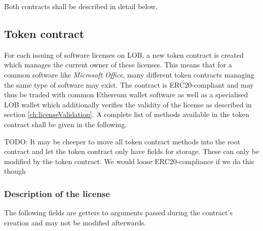 \documentclass[a4paper]{article}
\newcommand{\todo}[1]{\textsf{TODO: #1}}
\begin{document}
Both contracts shall be described in detail below.

\subsection{Token contract}
\label{ch:tokenContract}

For each issuing of software licenses on LOB, a new token contract is created which manages the current owner of these licenses. This means that for a common software like \emph{Microsoft Office}, many different token contracts managing the same type of software may exist. The contract is ERC20-compliant and may thus be traded with common Ethereum wallet software as well as a specialised LOB wallet which additionally verifies the validity of the license as described in section \ref{ch:licenseValidation}. A complete list of methods available in the token contract shall be given in the following.

\todo{It may be cheeper to move all token contract methods into the root contract and let the token contract only have fields for storage. These can only be modified by the token contract. We would loose ERC20-compliance if we do this though}

\subsubsection{Description of the license}

The following fields are getters to arguments passed during the contract's creation and may not be modified afterwards.
\end{document}
